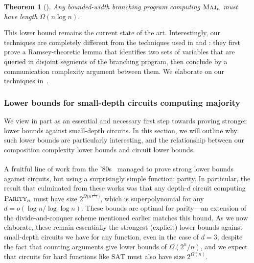 \documentclass[10pt,a4paper]{article}
\newtheorem{theorem}{Theorem}
\theoremstyle{definition}
\theoremstyle{remark}
\newcommand{\mathsc}[1]{{\normalfont\textsc{#1}}}
\DeclareMathOperator{\Maj}{\mathsc{Maj}}
\newcommand{\SAT}{\mathrm{SAT}}
\newcommand{\Parity}{\mathsc{Parity}}
\begin{document}
\begin{theorem}[\cite{AM86,BPRS90}]
Any bounded-width branching program computing $\Maj_n$ must have length $\Omega(n \log n)$.
\end{theorem}

This lower bound remains the current state of the art. Interestingly, our techniques are completely different from the techniques used in \cite{AM86} and \cite{BPRS90}: they first prove a Ramsey-theoretic lemma that identifies two sets of variables that are queried in disjoint segments of the branching program, then conclude by a communication complexity argument between them. 
We elaborate on our techniques in~. 


\subsubsection{Lower bounds for small-depth circuits computing majority}
\label{sssec:link-to-small-depth}

We view  in part as an essential and necessary first step towards proving stronger lower bounds against small-depth circuits. In this section, we will outline why such lower bounds are particularly interesting, and the relationship between our composition complexity lower bounds and circuit lower bounds.



\paragraph*{}

A fruitful line of work from the '80s~\cite{FSS81,Ajt83,Yao85,Has86} managed to prove strong lower bounds against  circuits, but using a surprisingly simple function: parity. In particular, the result that culminated from these works was that any depth-$d$ circuit computing $\Parity_n$ must have size $2^{\Omega\big(n^{\frac{1}{d-1}}\big)}$, which is superpolynomial for any $d = o(\log n/\log\log n)$. These bounds are optimal for parity---an extension of the divide-and-conquer scheme mentioned earlier matches this bound. As we now elaborate, these remain essentially  the strongest (explicit) lower bounds against small-depth circuits we have for any function, even in the case of $d=3$, despite the fact that counting arguments give lower bounds of $\Omega(2^n/n)$, and we expect that circuits for hard functions like $\SAT$ must also have size $2^{\Omega(n)}$. 
\end{document}

